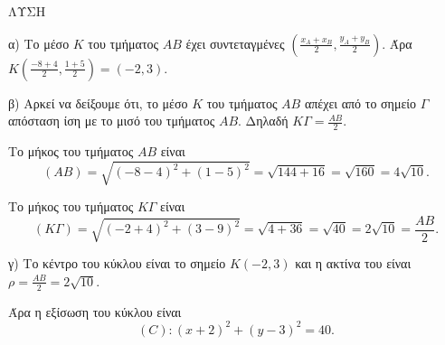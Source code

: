 \fontsize{12pt}{14pt}\selectfont
\noindent ΛΥΣΗ

\noindent α) Το μέσο $K$ του τμήματος $AB$ έχει συντεταγμένες $\left(\frac{x_A+x_B}{2}, \frac{y_A+y_B}{2}\right)$.
Άρα $K\left(\frac{-8+4}{2}, \frac{1+5}{2}\right) = (-2, 3)$.

\noindent β) Αρκεί να δείξουμε ότι, το μέσο $K$ του τμήματος $AB$ απέχει από το σημείο $\Gamma$ απόσταση ίση με το μισό του τμήματος $AB$. Δηλαδή $K\Gamma = \frac{AB}{2}$.

\noindent Το μήκος του τμήματος $AB$ είναι
\[ (AB) = \sqrt{(-8-4)^2 + (1-5)^2} = \sqrt{144 + 16} = \sqrt{160} = 4\sqrt{10} . \]

\noindent Το μήκος του τμήματος $K\Gamma$ είναι
\[ (K\Gamma) = \sqrt{(-2+4)^2 + (3-9)^2} = \sqrt{4 + 36} = \sqrt{40} = 2\sqrt{10} = \frac{AB}{2} . \]

\noindent γ) Το κέντρο του κύκλου είναι το σημείο $K(-2,3)$ και η ακτίνα του είναι $\rho = \frac{AB}{2} = 2\sqrt{10}$.

\noindent Άρα η εξίσωση του κύκλου είναι
\[ (C): (x+2)^2 + (y-3)^2 = 40. \]
\endlysh{}